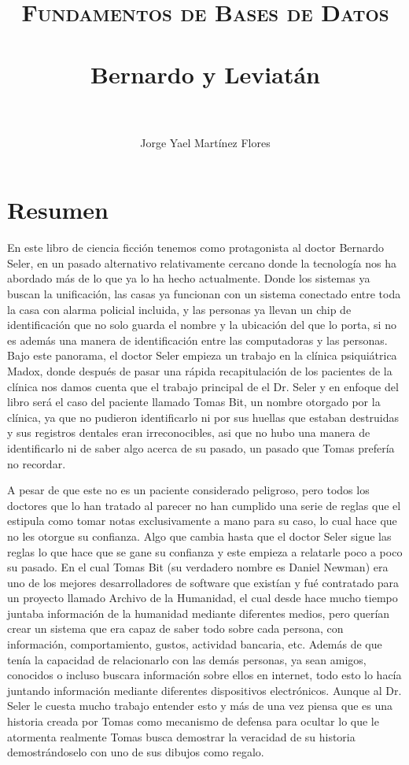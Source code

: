\documentclass[paper=letter, fontsize=12pt]{scrartcl} %
\title{	
\normalfont \normalsize 
\textsc{Fundamentos de Bases de Datos} \\ [25pt] %
\horrule{0.5pt} \\[0.5cm] %
\huge Bernardo y Leviatán \\ %
\horrule{2pt} \\[0.5cm] %
}
\author{Jorge Yael Martínez Flores} %
\date{} %
\begin{document}
\maketitle %


\section*{Resumen}

En este libro de ciencia ficción tenemos como protagonista al doctor Bernardo Seler, en un pasado alternativo relativamente cercano donde la tecnología nos ha abordado más de lo que ya lo ha hecho actualmente. Donde los sistemas ya buscan la unificación, las casas ya funcionan con un sistema conectado entre toda la casa con alarma policial incluida, y las personas ya llevan un chip de identificación que no solo guarda el nombre y la ubicación del que lo porta, si no es además una manera de identificación entre las computadoras y las personas. Bajo este panorama, el doctor Seler  empieza un trabajo en la clínica psiquiátrica Madox, donde después de pasar una rápida recapitulación de los pacientes de la clínica nos damos cuenta que el trabajo principal de el Dr. Seler y en enfoque del libro será el caso del paciente llamado Tomas Bit, un nombre otorgado por la clínica, ya que no pudieron identificarlo ni por sus huellas que estaban destruidas y sus registros dentales eran irreconocibles, asi que no hubo una manera de identificarlo ni de saber algo acerca de su pasado, un pasado que Tomas prefería no recordar.\vspace{4mm}

A pesar de que este no es un paciente considerado peligroso, pero todos los doctores que lo han tratado al parecer no han cumplido una serie de reglas que el estipula como tomar notas exclusivamente a mano para su caso, lo cual hace que no les otorgue su confianza. Algo que cambia hasta que el doctor Seler sigue las reglas lo que hace que se gane su confianza y este empieza a relatarle poco a poco su pasado. En el cual Tomas Bit (su verdadero nombre es Daniel Newman) era uno de los mejores desarrolladores de software que existían y fué contratado para  un proyecto llamado Archivo de la Humanidad, el cual desde hace mucho tiempo juntaba información de la humanidad mediante diferentes medios, pero querían crear un sistema que era capaz de saber todo sobre cada persona, con información, comportamiento, gustos, actividad bancaria, etc. Además de que tenía la capacidad de relacionarlo con las demás personas, ya sean amigos, conocidos o incluso buscara información sobre ellos en internet, todo esto lo hacía juntando información mediante diferentes dispositivos electrónicos. Aunque al Dr. Seler le cuesta mucho trabajo entender esto y más de una vez piensa que es una historia creada por Tomas como mecanismo de defensa para ocultar lo que le atormenta realmente Tomas busca demostrar la veracidad de su historia demostrándoselo con uno de sus dibujos como regalo.\vspace{4mm}
\end{document}
